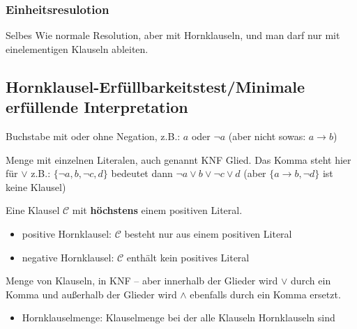 \documentclass[
    ngerman,
    color=3b,
    summary,
    boxarc,
    main,
    fleqn,
    leqno,
]{rubos-tuda-template}
\begin{document}
    \subsubsection{Einheitsresulotion}
    Selbes Wie normale Resolution, aber mit Hornklauseln, und man darf nur mit einelementigen Klauseln ableiten.
    \clearpage
    \subsection{Hornklausel-Erfüllbarkeitstest/Minimale erfüllende Interpretation}
    \begin{definition}[Literal]
        Buchstabe mit oder ohne Negation, z.B.: $a$ oder $\lnot a$ (aber nicht sowas: $a\rightarrow{}b$)
    \end{definition}
    \begin{definition}[Klausel]
        Menge mit einzelnen Literalen, auch genannt KNF Glied. Das Komma steht hier für $\lor$ z.B.: 
        $\{\lnot a, b,\lnot c, d\}$ bedeutet dann $\lnot a\lor b\lor\lnot c\lor d$ (aber $\{a\rightarrow{}b,\lnot d\}$ ist keine Klausel)
    \end{definition}
    \begin{definition}[Hornklausel]
        Eine Klausel $\mathcal{C}$ mit \textbf{höchstens} einem positiven Literal.
        \begin{itemize}
            \item positive Hornklausel: $\mathcal{C}$ besteht nur aus einem positiven Literal
            \item negative Hornklausel: $\mathcal{C}$ enthält kein positives Literal
        \end{itemize}
    \end{definition}
    \begin{definition}[Klauselmenge]
        Menge von Klauseln, in KNF -- aber innerhalb der Glieder wird $\lor$ durch ein Komma und außerhalb der Glieder wird $\land$ ebenfalls durch ein Komma ersetzt.
        \begin{itemize}
            \item Hornklauselmenge: Klauselmenge bei der alle Klauseln Hornklauseln sind
        \end{itemize}
    \end{definition}
\end{document}
